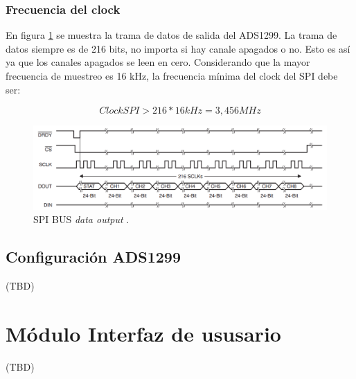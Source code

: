 \subsubsection{Frecuencia del clock}
\label{subsub:clockSPI}
En figura \ref{fig:DataOut} se muestra la trama de datos de salida del ADS1299. La trama de datos siempre es de 216 bits, no importa si hay canale apagados o no. Esto es así ya que los canales apagados se leen en cero. Considerando que la mayor frecuencia de muestreo es 16 kHz, la frecuencia mínima del clock del SPI debe ser:

\begin{equation}
	\label{eq:bitrate}
	ClockSPI > 216 * 16 kHz = 3,456 MHz
\end{equation}

\vspace{1cm}
\begin{figure}[htbp]
	\centering
	\includegraphics[width=1\textwidth]{./Figures/SPIDataOutput.png}
	\caption{SPI BUS \textit{data output} \protect\footnotemark.}
	\label{fig:DataOut}
\end{figure}
\vspace{1cm}



\subsection{Configuración ADS1299}
(TBD)

\section{Módulo Interfaz de ususario}
(TBD)
